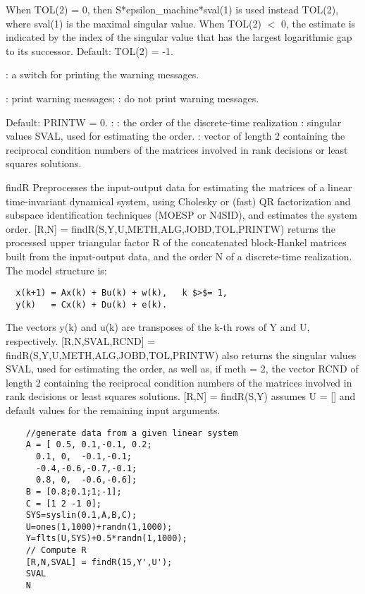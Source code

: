 \begin{parameters}
\begin{varlist}
\begin{varlist}
      When  TOL(2) = 0,  then  S*epsilon\_machine*sval(1)  is used instead TOL(2),  where  sval(1)  is the maximal singular value. When  TOL(2) $<$ 0,  the estimate is indicated by the index of the singular value that has the largest logarithmic gap to its successor. Default:    TOL(2) = -1.
    \end{varlist}
    : a switch for printing the warning messages.
    \begin{varlist}
      : print warning messages;
      : do not print warning messages.
    \end{varlist}
    Default: PRINTW = 0.
    :
    : the order of the discrete-time realization
    : singular values SVAL, used for estimating the order.
    : vector of length 2 containing the reciprocal condition numbers of the matrices involved in rank decisions or least squares solutions.
  \end{varlist}
\end{parameters}
\begin{mandescription}
  findR   Preprocesses the input-output data for estimating the matrices 
  of a linear time-invariant dynamical system, using Cholesky or
  (fast) QR factorization and subspace identification techniques 
  (MOESP or N4SID), and estimates the system order.
  [R,N] = findR(S,Y,U,METH,ALG,JOBD,TOL,PRINTW)  returns the processed
  upper triangular factor  R  of the concatenated block-Hankel matrices 
  built from the input-output data, and the order  N  of a discrete-time
  realization. The model structure is:
\begin{verbatim}
  x(k+1) = Ax(k) + Bu(k) + w(k),   k $>$= 1,
  y(k)   = Cx(k) + Du(k) + e(k).
\end{verbatim}
The vectors y(k) and u(k) are transposes of the k-th rows of Y and U,
respectively.
[R,N,SVAL,RCND] = findR(S,Y,U,METH,ALG,JOBD,TOL,PRINTW)  also returns
the singular values SVAL, used for estimating the order, as well as,
if meth = 2, the vector RCND of length 2 containing the reciprocal
condition numbers of the matrices involved in rank decisions or least
squares solutions.
[R,N] = findR(S,Y)  assumes U = [] and default values for the
remaining input arguments.
\end{mandescription}
\begin{examples}
  \begin{Verbatim}
    //generate data from a given linear system
    A = [ 0.5, 0.1,-0.1, 0.2;
      0.1, 0,  -0.1,-0.1;      
      -0.4,-0.6,-0.7,-0.1;  
      0.8, 0,  -0.6,-0.6];      
    B = [0.8;0.1;1;-1];
    C = [1 2 -1 0];
    SYS=syslin(0.1,A,B,C);
    U=ones(1,1000)+randn(1,1000);
    Y=flts(U,SYS)+0.5*randn(1,1000);
    // Compute R
    [R,N,SVAL] = findR(15,Y',U');
    SVAL
    N
  \end{Verbatim}
\end{examples}
\begin{manseealso}
         
\end{manseealso}
